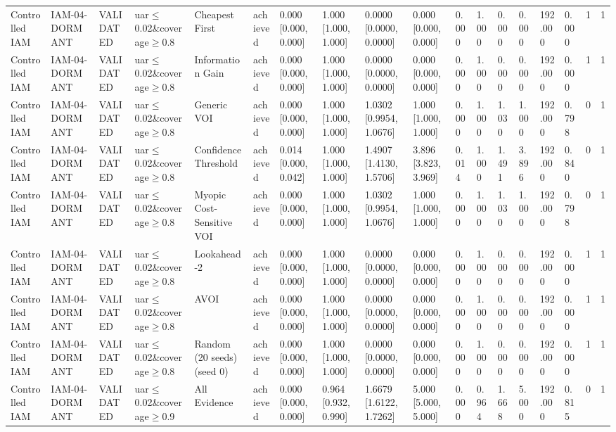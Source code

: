 \begin{table}[!ht]
{\begin{tabular}{llllllllllllllllll}
Controlled IAM & IAM-04-DORMANT & VALIDATED & uar$\le$0.02\&coverage$\ge$0.8 & Cheapest First & achieved & 0.000 [0.000, 0.000] & 1.000 [1.000, 1.000] & 0.0000 [0.0000, 0.0000] & 0.000 [0.000, 0.000] & 0.000 & 1.000 & 0.000 & 0.000 & 192.000 & 0.000 & 1 & 1 \\
Controlled IAM & IAM-04-DORMANT & VALIDATED & uar$\le$0.02\&coverage$\ge$0.8 & Information Gain & achieved & 0.000 [0.000, 0.000] & 1.000 [1.000, 1.000] & 0.0000 [0.0000, 0.0000] & 0.000 [0.000, 0.000] & 0.000 & 1.000 & 0.000 & 0.000 & 192.000 & 0.000 & 1 & 1 \\
Controlled IAM & IAM-04-DORMANT & VALIDATED & uar$\le$0.02\&coverage$\ge$0.8 & Generic VOI & achieved & 0.000 [0.000, 0.000] & 1.000 [1.000, 1.000] & 1.0302 [0.9954, 1.0676] & 1.000 [1.000, 1.000] & 0.000 & 1.000 & 1.030 & 1.000 & 192.000 & 0.798 & 0 & 1 \\
Controlled IAM & IAM-04-DORMANT & VALIDATED & uar$\le$0.02\&coverage$\ge$0.8 & Confidence Threshold & achieved & 0.014 [0.000, 0.042] & 1.000 [1.000, 1.000] & 1.4907 [1.4130, 1.5706] & 3.896 [3.823, 3.969] & 0.014 & 1.000 & 1.491 & 3.896 & 192.000 & 0.840 & 0 & 1 \\
Controlled IAM & IAM-04-DORMANT & VALIDATED & uar$\le$0.02\&coverage$\ge$0.8 & Myopic Cost-Sensitive VOI & achieved & 0.000 [0.000, 0.000] & 1.000 [1.000, 1.000] & 1.0302 [0.9954, 1.0676] & 1.000 [1.000, 1.000] & 0.000 & 1.000 & 1.030 & 1.000 & 192.000 & 0.798 & 0 & 1 \\
Controlled IAM & IAM-04-DORMANT & VALIDATED & uar$\le$0.02\&coverage$\ge$0.8 & Lookahead-2 & achieved & 0.000 [0.000, 0.000] & 1.000 [1.000, 1.000] & 0.0000 [0.0000, 0.0000] & 0.000 [0.000, 0.000] & 0.000 & 1.000 & 0.000 & 0.000 & 192.000 & 0.000 & 1 & 1 \\
Controlled IAM & IAM-04-DORMANT & VALIDATED & uar$\le$0.02\&coverage$\ge$0.8 & AVOI & achieved & 0.000 [0.000, 0.000] & 1.000 [1.000, 1.000] & 0.0000 [0.0000, 0.0000] & 0.000 [0.000, 0.000] & 0.000 & 1.000 & 0.000 & 0.000 & 192.000 & 0.000 & 1 & 1 \\
Controlled IAM & IAM-04-DORMANT & VALIDATED & uar$\le$0.02\&coverage$\ge$0.8 & Random (20 seeds) (seed 0) & achieved & 0.000 [0.000, 0.000] & 1.000 [1.000, 1.000] & 0.0000 [0.0000, 0.0000] & 0.000 [0.000, 0.000] & 0.000 & 1.000 & 0.000 & 0.000 & 192.000 & 0.000 & 1 & 1 \\
Controlled IAM & IAM-04-DORMANT & VALIDATED & uar$\le$0.02\&coverage$\ge$0.9 & All Evidence & achieved & 0.000 [0.000, 0.000] & 0.964 [0.932, 0.990] & 1.6679 [1.6122, 1.7262] & 5.000 [5.000, 5.000] & 0.000 & 0.964 & 1.668 & 5.000 & 192.000 & 0.815 & 0 & 1 \\

\end{tabular}}
\end{table}
